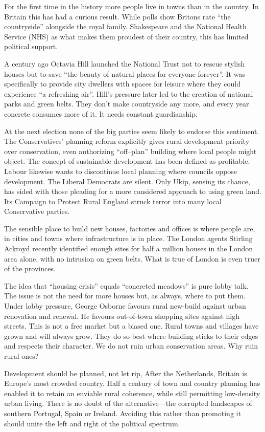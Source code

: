 For the first time in the history more people live in towns than in the
country. In Britain this has had a curious result. While polls show
Britons rate ``the countryside'' alongside the royal family.
Shakespeare and the National Health Service (NHS) as what makes them
proudest of their country, this has limited political support.

A century ago Octavia Hill launched the National Trust not to rescue
stylish houses but to save ``the beauty of natural places for everyone
forever''. It was specifically to provide city dwellers with spaces for
leisure where they could experience ``a refreshing air''. Hill's
pressure later led to the creation of national parks and green belts.
They don't make countryside any more, and every year concrete consumes
more of it. It needs constant guardianship.

At the next election none of the big parties seem likely to endorse
this sentiment. The Conservatives' planning reform explicitly gives
rural development priority over conservation, even authorizing
``off--plan'' building where local people might object. The concept of
sustainable development has been defined as profitable. Labour likewise
wants to discontinue local planning where councils oppose development.
The Liberal Democrats are silent. Only Ukip, sensing its chance, has
sided with those pleading for a more considered approach to using green
land. Its Campaign to Protect Rural England struck terror into many
local Conservative parties.

The sensible place to build new houses, factories and offices is
where people are, in cities and towns where infrastructure is in
place. The London agents Stirling Ackroyd recently identified enough
sites for half a million houses in the London area alone, with no
intrusion on green belts. What is true of London is even truer of the
provinces.

The idea that ``housing crisis'' equals ``concreted meadows'' is pure
lobby talk. The issue is not the need for more houses but, as always,
where to put them. Under lobby pressure, George Osborne favours rural
new-build against urban renovation and renewal. He favours out-of-town
shopping sites against high streets. This is not a free market but a
biased one. Rural towns and villages have grown and will always grow.
They do so best where building sticks to their edges and respects their
character. We do not ruin urban conservation areas. Why ruin rural
ones?

Development should be planned, not let rip, After the
Netherlands, Britain is Europe's most crowded country. Half a century
of town and country planning has enabled it to retain an enviable rural
coherence, while still permitting low-density urban living. There is
no doubt of the alternative---the corrupted landscapes of southern
Portugal, Spain or Ireland. Avoiding this rather than promoting it
should unite the left and right of the political spectrum.


